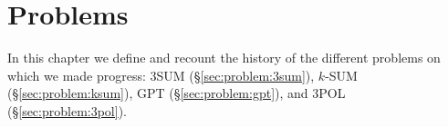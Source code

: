 \chapter{Problems}

In this chapter we define and recount the history of the different problems on
which we made progress:
%
3SUM (\S\ref{sec:problem:3sum}),
\(k\)-SUM (\S\ref{sec:problem:ksum}),
GPT (\S\ref{sec:problem:gpt}),
and 3POL (\S\ref{sec:problem:3pol}).





